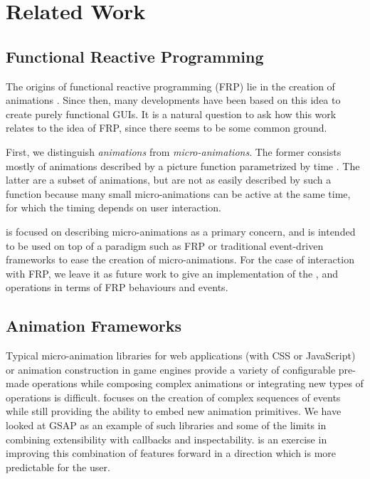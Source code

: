 \section{Related Work}
\label{sec:related}

\subsection{Functional Reactive Programming}
The origins of functional reactive programming (FRP) lie in the creation of animations \cite{DBLP:conf/icfp/ElliottH97}. Since then, many developments have been based on this idea to create purely functional GUIs. It is a natural question to ask how this work relates to the idea of FRP, since there seems to be some common ground.

First, we distinguish \emph{animations} from \emph{micro-animations}. The former consists mostly of animations described by a picture function parametrized by time . The latter are a subset of animations, but are not as easily described by such a function because many small micro-animations can be active at the same time, for which the timing depends on user interaction.

\dsl{} is focused on describing micro-animations as a primary concern, and is intended to be used on top of a paradigm such as FRP or traditional event-driven frameworks to ease the creation of micro-animations. For the case of interaction with FRP, we leave it as future work to give an implementation of the ,  and  operations in terms of FRP behaviours and events.

\subsection{Animation Frameworks}

Typical micro-animation libraries for web applications (with CSS or JavaScript) or animation construction in game engines provide a variety of configurable pre-made operations while composing complex animations or integrating new types of operations is difficult. \dsl{} focuses on the creation of complex sequences of events while still providing the ability to embed new animation primitives. We have looked at GSAP as an example of such libraries and some of the limits in combining extensibility with callbacks and inspectability. \dsl{} is an exercise in improving this combination of features forward in a direction which is more predictable for the user.

